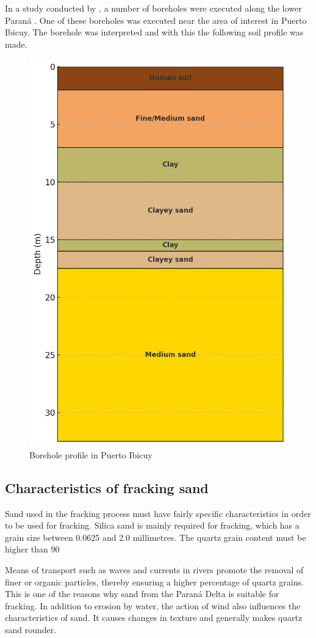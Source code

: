 In a study conducted by \citeauthor{amatoEstratigrafiaCuaternariaSubsuelo2009}, a number of boreholes were executed along the lower Paraná \autocite{amatoEstratigrafiaCuaternariaSubsuelo2009}. One of these boreholes was executed near the area of interest in Puerto Ibicuy. The borehole was interpreted and with this the following soil profile was made.

\begin{figure}[H]
    \centering
    \includegraphics[width=0.45\linewidth]{figures//ch9/Bodemprofiel.png}
    \caption{Borehole profile in Puerto Ibicuy \autocite{amatoEstratigrafiaCuaternariaSubsuelo2009}}
    \label{fig:borehole}
\end{figure}

\subsection{Characteristics of fracking sand}
\label{sec:Charact. of fs}
Sand used in the fracking process must have fairly specific characteristics in order to be used for fracking. Silica sand is mainly required for fracking, which has a grain size between 0.0625 and 2.0 millimetres. The quartz grain content must be higher than 90%

Means of transport such as waves and currents in rivers promote the removal of finer or organic particles, thereby ensuring a higher percentage of quartz grains. This is one of the reasons why sand from the Paraná Delta is suitable for fracking.
In addition to erosion by water, the action of wind also influences the characteristics of sand. It causes changes in texture and generally makes quartz sand rounder. 

